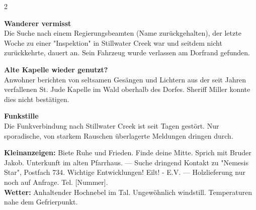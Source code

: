 \documentclass[10pt, a4paper]{article}
\newcommand{\articlesep}{\vspace{0.6em}}
\begin{document}
\begin{multicols}{2}
\hrulefill

\articlesep
\large \textbf{Wanderer vermisst} \normalsize \\
Die Suche nach einem Regierungsbeamten (Name zurückgehalten), der letzte Woche zu einer "Inspektion" in Stillwater Creek war und seitdem nicht zurückkehrte, dauert an. Sein Fahrzeug wurde verlassen am Dorfrand gefunden.

\articlesep
\large \textbf{Alte Kapelle wieder genutzt?} \normalsize \\
Anwohner berichten von seltsamen Gesängen und Lichtern aus der seit Jahren verfallenen St. Jude Kapelle im Wald oberhalb des Dorfes. Sheriff Miller konnte dies nicht bestätigen.

\articlesep
\large \textbf{Funkstille} \normalsize \\
Die Funkverbindung nach Stillwater Creek ist seit Tagen gestört. Nur sporadische, von starkem Rauschen überlagerte Meldungen dringen durch.

\hrulefill

\small
\textbf{Kleinanzeigen:} Biete Ruhe und Frieden. Finde deine Mitte. Sprich mit Bruder Jakob. Unterkunft im alten Pfarrhaus. --- Suche dringend Kontakt zu "Nemesis Star", Postfach 734. Wichtige Entwicklungen! Eilt! - E.V. --- Holzlieferung nur noch auf Anfrage. Tel. [Nummer]. \\
\textbf{Wetter:} Anhaltender Hochnebel im Tal. Ungewöhnlich windstill. Temperaturen nahe dem Gefrierpunkt.
\normalsize

\end{multicols}
\end{document}
